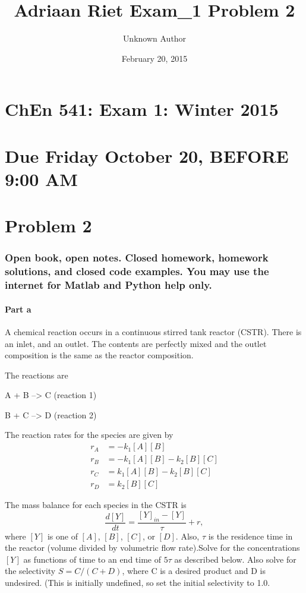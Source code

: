 \documentclass[letterpaper,10pt,english]{/usr/share/sphinx/texinputs/sphinxhowto}
\title{Adriaan Riet Exam\_1 Problem 2}
\date{February 20, 2015}
\author{Unknown Author}
\begin{document}
        
            \maketitle
        

        


        
        \part{ChEn 541: Exam 1: Winter 2015}\part{Due Friday October 20, BEFORE 9:00 AM}\part{Problem 2}\section{Open book, open notes. Closed homework, homework solutions, and closed
code examples. You may use the internet for Matlab and Python help only.}\subsection{Part a}A chemical reaction occurs in a continuous stirred tank reactor (CSTR).
There is an inlet, and an outlet. The contents are perfectly mixed and
the outlet composition is the same as the reactor composition.

The reactions are

A + B --\textgreater{} C (reaction 1)

B + C --\textgreater{} D (reaction 2)

The reaction rates for the species are given by \[\begin{align} 
r_A &= -k_1[A][B] \\
r_B &= -k_1[A][B] - k_2[B][C] \\
r_C &= k_1[A][B] - k_2[B][C] \\
r_D &= k_2[B][C]
\end{align}\]

The mass balance for each species in the CSTR is
\[ \frac{d[Y]}{dt} = \frac{[Y]_{in}-[Y]}{\tau} + r,\] where $[Y]$ is one
of $[A]$, $[B]$, $[C]$, or $[D]$. Also, $\tau$ is the residence time in
the reactor (volume divided by volumetric flow rate).Solve for the concentrations $[Y]$ as functions of time to an end time
of $5\tau$ as described below. Also solve for the selectivity
$S=C/(C+D)$, where C is a desired product and D is undesired. (This is
initially undefined, so set the initial selectivity to 1.0.
\end{document}

